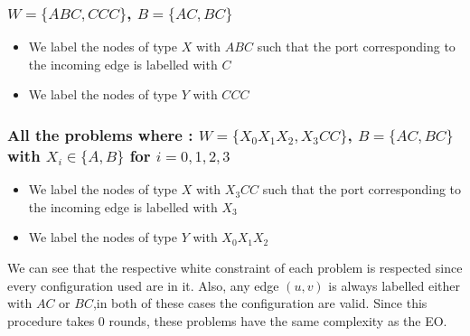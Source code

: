 \subsubsection[(W = (ABC, CCC), B = (AC,BC)]{$W = \{ABC, CCC\}$, $B = \{AC, BC\}$}
\begin{itemize}
    \item We label the nodes of type $X$ with $ABC$ such that the port corresponding to the incoming edge is labelled with $C$
    \item We label the nodes of type $Y$ with $CCC$
\end{itemize}

\subsubsection[(W = (X0X1X2, X3CC), B = (AC,BC)]{All the problems where : $W = \{X_0X_1X_2, X_3CC\}$, $B = \{AC, BC\}$ with $X_i \in \{A,B\}$ for $i=0,1,2,3$}
\begin{itemize}
    \item We label the nodes of type $X$ with $X_3CC$ such that the port corresponding to the incoming edge is labelled with $X_3$
    \item We label the nodes of type $Y$ with $X_0X_1X_2$
\end{itemize}
We can see that the respective white constraint of each problem is respected since every configuration used are in it. Also, any edge $(u,v)$ is always labelled either with $AC$ or $BC$,in both of these cases the configuration are valid. Since this procedure takes 0 rounds, these problems have the same complexity as the EO.


